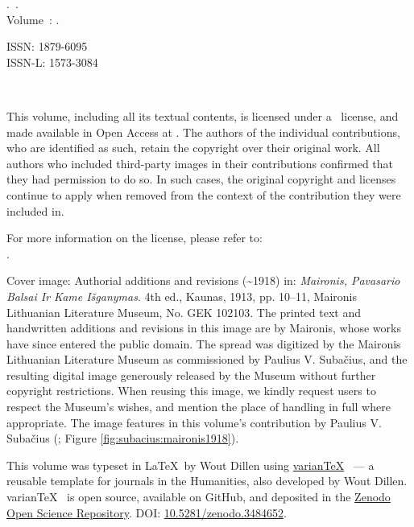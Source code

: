 \null\vfill\small
\noindent\emph{\thejournal}.~\thejournalsubtitle. \\ 
\noindent Volume~\thevolume: \thevolumetitle. \\ \par
\noindent ISSN: 1879-6095 \\
\noindent ISSN-L: 1573-3084 \\ \par
\noindent\doclicenseIcon \ \theyear \\ \par 
\noindent This volume, including all its textual contents, is licensed under a \doclicenseLongNameRef \ license, and made available in Open Access at \href{\thewebsite}{\thewebsite}. The authors of the individual contributions, who are identified as such, retain the copyright over their original work.  All authors who included third-party images in their contributions confirmed that they had permission to do so. In such cases, the original copyright and licenses continue to apply when removed from the context of the contribution they were included in. \\ \par
\noindent For more information on the \doclicenseNameRef license, please refer to: \\ \doclicenseURL.  \\ \par

\noindent Cover image: Authorial additions and revisions (\textasciitilde 1918) in: \textit{Maironis, Pavasario Balsai Ir Kame Išganymas}. 4th ed., Kaunas, 1913, pp. 10–11, Maironis Lithuanian Literature Museum, No. GEK 102103. The printed text and handwritten additions and revisions in this image are by Maironis, whose works have since entered the public domain. The spread was digitized by the Maironis Lithuanian Literature Museum as commissioned by Paulius V. Subačius, and the resulting digital image generously released by the Museum without further copyright restrictions. When reusing this image, we kindly request users to respect the Museum's wishes, and mention the place of handling in full where appropriate. The image features in this volume's contribution by Paulius V. Subačius (\pageref{fig:subacius:maironis1918}; Figure \ref{fig:subacius:maironis1918}). \\ \par

\noindent This volume was typeset in \LaTeX~by Wout Dillen using \href{https://github.com/WoutDLN/variantx}{varian\TeX} ~--- a reusable template for journals in the Humanities, also developed by Wout Dillen. \mbox{varian\TeX} ~is open source, available on GitHub, and deposited in the \href{https://about.zenodo.org}{Zenodo Open Science Repository}. DOI: \href{https://zenodo.org/record/3484652#.X0PdDy2w3kI}{10.5281/zenodo.3484652}.
\newpage